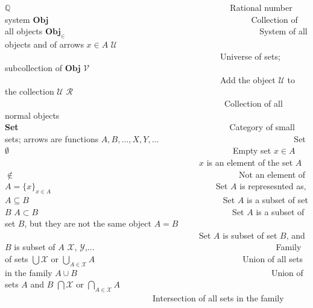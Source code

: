 \documentclass [12pt]{book}
\begin{document}
$\mathbb Q$~~~~~~~~~~~~~~~~~~~~~~~~~~~~~~~~~~~~~~~~~~~~~~~~~~~~Rational number system\newline
$\textbf{Obj}$~~~~~~~~~~~~~~~~~~~~~~~~~~~~~~~~~~~~~~~~~~~~~~~~Collection of all objects\newline
$\textbf{Obj}_\in$~~~~~~~~~~~~~~~~~~~~~~~~~~~~~~~~~~~~~~~~~~~~~~System of all objects and of arrows $x\in A$\newline
$\mathcal U$~~~~~~~~~~~~~~~~~~~~~~~~~~~~~~~~~~~~~~~~~~~~~~~~~~~Universe of sets; subcollection of $\textbf{Obj}$\newline
$\mathcal V$~~~~~~~~~~~~~~~~~~~~~~~~~~~~~~~~~~~~~~~~~~~~~~~~~~~Add the object $\mathcal U$ to the collection $\mathcal U$\newline
$\mathcal R$~~~~~~~~~~~~~~~~~~~~~~~~~~~~~~~~~~~~~~~~~~~~~~~~~~~~Collection of all normal objects\newline
\textbf{Set}~~~~~~~~~~~~~~~~~~~~~~~~~~~~~~~~~~~~~~~~~~~~~~~~~~Category of small sets; arrows are functions\newline
$A,B,...,X,Y,...$~~~~~~~~~~~~~~~~~~~~~~~~~~~~~~~~Set\newline
$\emptyset$~~~~~~~~~~~~~~~~~~~~~~~~~~~~~~~~~~~~~~~~~~~~~~~~~~~~~Empty set\newline
$x\in A$~~~~~~~~~~~~~~~~~~~~~~~~~~~~~~~~~~~~~~~~~~~~~~$x$ is an element of the set $A$\newline
$\notin$~~~~~~~~~~~~~~~~~~~~~~~~~~~~~~~~~~~~~~~~~~~~~~~~~~~~~Not an element of\newline
$A=\{x\}_{x\in A}$~~~~~~~~~~~~~~~~~~~~~~~~~~~~~~~~~~~~~~~Set $A$ is represesnted as,\newline
$A\subseteq B$~~~~~~~~~~~~~~~~~~~~~~~~~~~~~~~~~~~~~~~~~~~~~~Set $A$ is a subset of set $B$\newline
$A\subset B$~~~~~~~~~~~~~~~~~~~~~~~~~~~~~~~~~~~~~~~~~~~~~~Set $A$ is a subset of set $B$, but they are not the same object\newline
$A=B$~~~~~~~~~~~~~~~~~~~~~~~~~~~~~~~~~~~~~~~~~~~~~~Set $A$ is subset of set $B$, and $B$ is subset of $A$\newline
$\mathcal X$, $\mathcal Y$,...~~~~~~~~~~~~~~~~~~~~~~~~~~~~~~~~~~~~~~~~~~~Family of sets\newline
$\bigcup\mathcal X$ or $\bigcup\limits_{A\in\mathcal X}A$~~~~~~~~~~~~~~~~~~~~~~~~~~~~~~~~~~~Union of all sets in the family\newline
$A\cup B$~~~~~~~~~~~~~~~~~~~~~~~~~~~~~~~~~~~~~~~~~~~~~~Union of sets $A$ and $B$\newline
$\bigcap\mathcal X$ or $\bigcap\limits_{A\in\mathcal X}A$~~~~~~~~~~~~~~~~~~~~~~~~~~~~~~~~~~~Intersection of all sets in the family\newline
\end{document}

